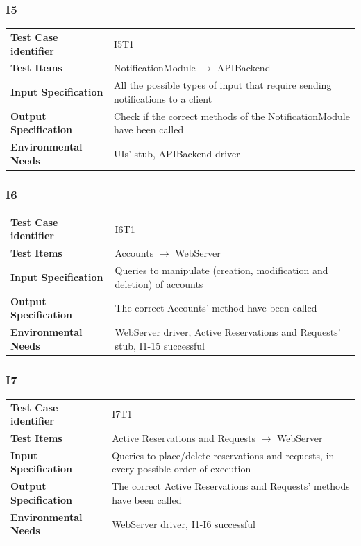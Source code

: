 \documentclass{article}
\begin{document}
\subsubsection{I5}
\begin{adjustbox}{width=1.2\textwidth}	
	\begin{tabular}{*{2}{p{}}}
		\toprule
		\textbf{Test Case identifier} & I5T1\\
		\textbf{Test Items} & NotificationModule $\rightarrow$ APIBackend\\
		\textbf{Input Specification} & All the possible types of input that require sending notifications to a client \\ 
		\textbf{Output Specification} & Check if the correct methods of the NotificationModule have been called\\
		\textbf{Environmental Needs} & UIs' stub, APIBackend driver\\
		\bottomrule
	\end{tabular}
\end{adjustbox}
\subsubsection{I6}
\begin{adjustbox}{width=1.2\textwidth}	
	\begin{tabular}{*{2}{p{}}}
		\toprule
		\textbf{Test Case identifier} & I6T1\\
		\textbf{Test Items} & Accounts $\rightarrow$ WebServer\\
		\textbf{Input Specification} & Queries to manipulate (creation, modification and deletion) of accounts\\
		\textbf{Output Specification} & The correct Accounts' method have been called\\
		\textbf{Environmental Needs} & WebServer driver, Active Reservations and Requests' stub, I1-15 successful\\
		\bottomrule
	\end{tabular}
\end{adjustbox}
\subsubsection{I7}
\begin{adjustbox}{width=1.2\textwidth}	
	\begin{tabular}{*{2}{p{}}}
		\toprule
		\textbf{Test Case identifier} & I7T1\\
		\textbf{Test Items} & Active Reservations and Requests $\rightarrow$ WebServer\\
		\textbf{Input Specification} & Queries to place/delete reservations and requests, in every possible order of execution\\ 
		\textbf{Output Specification} & The correct Active Reservations and Requests' methods have been called\\
		\textbf{Environmental Needs} & WebServer driver, I1-I6 successful\\
		\bottomrule
	\end{tabular}
\end{adjustbox}
\end{document}
